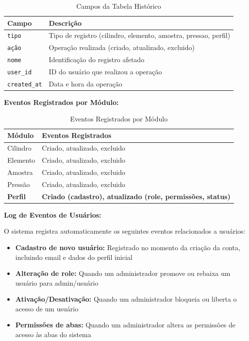 \documentclass[12pt,a4paper]{article}
\providecommand\关键字[1]{\textbf{#1}}
\begin{document}
\begin{table}[h!]
\centering
\caption{Campos da Tabela Histórico}
\label{tab:historico-campos}
\begin{tabular}{@{}ll@{}}
\toprule
\textbf{Campo} & \textbf{Descrição} \\
\midrule
\texttt{tipo} & Tipo de registro (cilindro, elemento, amostra, pressao, perfil) \\
\texttt{ação} & Operação realizada (criado, atualizado, excluido) \\
\texttt{nome} & Identificação do registro afetado \\
\texttt{user\_id} & ID do usuário que realizou a operação \\
\texttt{created\_at} & Data e hora da operação \\
\bottomrule
\end{tabular}
\end{table}

\textbf{Eventos Registrados por Módulo:}

\begin{table}[h!]
\centering
\caption{Eventos Registrados por Módulo}
\label{tab:eventos-modulo}
\begin{tabular}{@{}ll@{}}
\toprule
\textbf{Módulo} & \textbf{Eventos Registrados} \\
\midrule
Cilindro & Criado, atualizado, excluido \\
Elemento & Criado, atualizado, excluido \\
Amostra & Criado, atualizado, excluido \\
Pressão & Criado, atualizado, excluido \\
\textbf{Perfil} & \textbf{Criado (cadastro), atualizado (role, permissões, status)} \\
\bottomrule
\end{tabular}
\end{table}

\textbf{Log de Eventos de Usuários:}

O sistema registra automaticamente os seguintes eventos relacionados a usuários:

\begin{itemize}
\item \textbf{Cadastro de novo usuário:} Registrado no momento da criação da conta, incluindo email e dados do perfil inicial
\item \textbf{Alteração de role:} Quando um administrador promove ou rebaixa um usuário para admin/usuário
\item \textbf{Ativação/Desativação:} Quando um administrador bloqueia ou liberta o acesso de um usuário
\item \textbf{Permissões de abas:} Quando um administrador altera as permissões de acesso às abas do sistema
\end{itemize}
\end{document}
